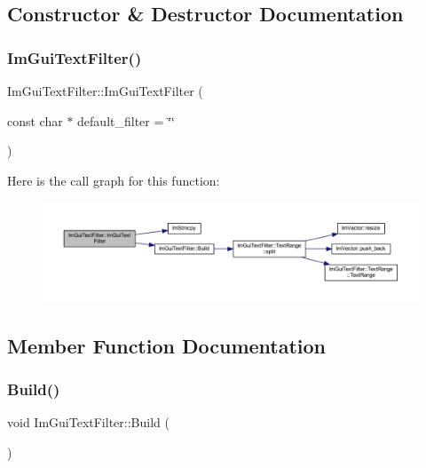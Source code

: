 \subsection{Constructor \& Destructor Documentation}
\mbox{\label{struct_im_gui_text_filter_a0a61ee76f0b4f3c354791734b06e3140}} 
\subsubsection{\texorpdfstring{Im\+Gui\+Text\+Filter()}{ImGuiTextFilter()}}
{\footnotesize\ttfamily Im\+Gui\+Text\+Filter\+::\+Im\+Gui\+Text\+Filter (\begin{DoxyParamCaption}\item[{const char $\ast$}]{default\+\_\+filter = {\ttfamily \char`\"{}\char`\"{}} }\end{DoxyParamCaption})}

Here is the call graph for this function\+:
\nopagebreak
\begin{figure}[H]
\begin{center}
\leavevmode
\includegraphics[width=350pt]{struct_im_gui_text_filter_a0a61ee76f0b4f3c354791734b06e3140_cgraph}
\end{center}
\end{figure}


\subsection{Member Function Documentation}
\mbox{\label{struct_im_gui_text_filter_aef362baafaa9dfa62d11bc6101c0f4c1}} 
\subsubsection{\texorpdfstring{Build()}{Build()}}
{\footnotesize\ttfamily void Im\+Gui\+Text\+Filter\+::\+Build (\begin{DoxyParamCaption}{ }\end{DoxyParamCaption})}

